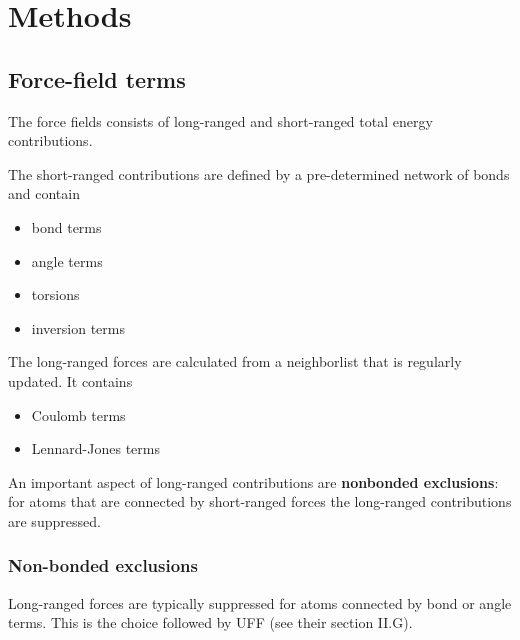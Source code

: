 \documentclass[11pt,a4paper]{report}
\begin{document}
\chapter{Methods}


\section{Force-field terms}
The force fields consists of long-ranged and short-ranged total energy
contributions. 

The short-ranged contributions are defined by a
pre-determined network of bonds and contain
\begin{itemize}
\item bond terms
\item angle terms
\item torsions
\item inversion terms
\end{itemize}

The long-ranged forces are calculated from a neighborlist that is
regularly updated. It contains
\begin{itemize}
\item Coulomb terms
\item Lennard-Jones terms
\end{itemize}
An important aspect of long-ranged contributions are \textbf{nonbonded
  exclusions}: for atoms that are connected by short-ranged forces the
long-ranged contributions are suppressed.


\subsection{Non-bonded exclusions}
Long-ranged forces are typically suppressed for atoms connected by
bond or angle terms. This is the choice followed by
UFF\cite{rappe92_jacs114_10024} (see their section II.G).
\end{document}
